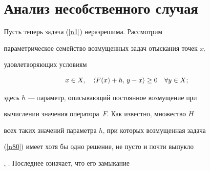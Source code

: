 







\section{Анализ несобственного случая}





Пусть теперь задача (\ref{n1}) неразрешима. Рассмотрим


параметрическое семейство возмущенных задач отыскания точек $x$,


удовлетворяющих условиям


\begin{equation}\label{n80}


x\in X,\quad \lft F(x)+h,\, y-x \rgt \geq0\quad


\forall y\in X;


\end{equation}


здесь $h$ --- параметр, описывающий постоянное возмущение при


вычислении значения оператора~$F$. Как известно, множество $H$


всех таких значений параметра $h$, при которых возмущенная задача


(\ref{n80}) имеет хотя бы одно решение, не пусто и почти выпукло


\cite{kokur}, \cite{ppf2}. Последнее означает, что его замыкание


